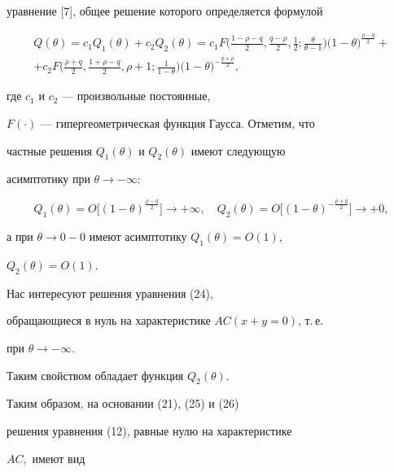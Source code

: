 уравнение [7], общее решение которого определяется формулой


\begin{multline}


Q(\theta )=c_1Q_1(\theta )+c_2Q_2(\theta )=


c_1F\bigg(\frac{1-\rho-q}{2},\frac{q-\rho}{2},\frac{1}{2};


\frac{\theta}{\theta -1}\bigg)\biggl(1-\theta \biggr)^


{\frac{\rho-q}{2}}+ \\


%


+c_2F\bigg(\frac{\rho+q}{2},\frac{1+\rho-q}{2},\rho+1;


\frac{1}{1-\theta}\bigg)\bigg(1-\theta


\bigg)^{-\frac{q+\rho}{2}},


\end{multline}


где $c_1$ и $c_2$ --- произвольные постоянные,


$F(\cdot)$ --- гипергеометрическая функция Гаусса. Отметим, что


частные решения $Q_1(\theta)$ и $Q_2(\theta)$ имеют следующую


асимптотику при $\theta \to -\infty$:


$$


Q_1(\theta)=O\bigg[(1-\theta)^{\frac{\rho-q}{2}}\bigg]\to


+\infty,\quad


Q_2(\theta)=O\bigg[(1-\theta)^{-\frac{\rho+q}{2}}\bigg]\to +0,


$$


а при $\theta \to 0-0$ имеют асимптотику $Q_1(\theta )=O(1)$,


$Q_2(\theta)=O(1).$





Нас интересуют решения уравнения (24),


обращающиеся в нуль на характеристике $AC(x+y=0)$, т.\,е.


при $\theta \to -\infty.$


Таким свойством обладает функция $Q_2(\theta ).$





Таким образом, на основании (21), (25) и (26)


решения уравнения (12), равные нулю на характеристике


$AC,$ имеют вид


